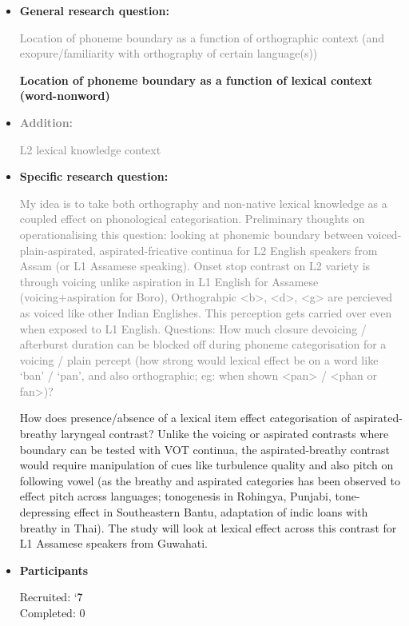 \documentclass[12pt, english]{article}
\begin{document}
\begin{itemize}
    \item \textbf{General research question:} \par
    \textcolor{gray}{Location of phoneme boundary as a function of orthographic context (and exopure/familiarity with orthography of certain language(s))} \par
    \textbf{Location of phoneme boundary as a function of lexical context (word-nonword)}
    \item \textbf{\textcolor{gray}{Addition:}} \par
    \textcolor{gray}{L2 lexical knowledge context}
    \item \textbf{Specific research question:} \par
    \textcolor{gray}{My idea is to take both orthography and non-native lexical knowledge as a coupled effect on phonological categorisation. Preliminary thoughts on operationalising this question: looking at phonemic boundary between voiced-plain-aspirated, aspirated-fricative continua for L2 English speakers from Assam (or L1 Assamese speaking). Onset stop contrast on L2 variety is through voicing unlike aspiration in L1 English for Assamese (voicing+aspiration for Boro), Orthograhpic <b>, <d>, <g> are percieved as voiced like other Indian Englishes. This perception gets carried over even when exposed to L1 English. Questions: How much closure devoicing / afterburst duration can be blocked off during phoneme categorisation for a voicing / plain percept (how strong would lexical effect be on a word like `ban' / `pan', and also orthographic; eg: when shown <pan> / <phan or fan>)?} \par
    How does presence/absence of a lexical item effect categorisation of aspirated-breathy laryngeal contrast? Unlike the voicing or aspirated contrasts where boundary can be tested with VOT continua, the aspirated-breathy contrast would require manipulation of cues like turbulence quality and also pitch on following vowel (as the breathy and aspirated categories has been observed to effect pitch across languages; tonogenesis in Rohingya, Punjabi, tone-depressing effect in Southeastern Bantu, adaptation of indic loans with breathy in Thai). The study will look at lexical effect across this contrast for L1 Assamese speakers from Guwahati.       
    \item \textbf{Participants} \par
    Recruited: \char`\~ 7 \\
    Completed: 0 \par

\end{itemize}
\end{document}
